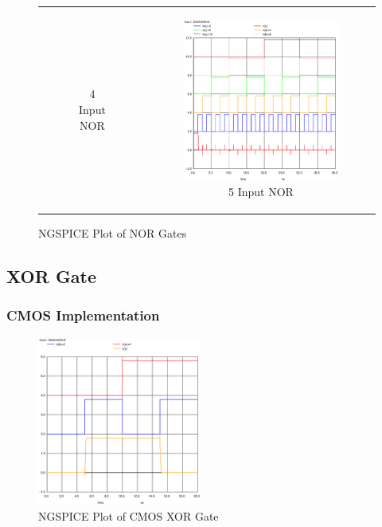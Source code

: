\documentclass[conference]{IEEEtran}
\begin{document}
\begin{figure}[H]
\begin{tabular}{cc}
\begin{subfigure}{0.44\linewidth}
            \caption{4 Input NOR}
        \end{subfigure} &
        \begin{subfigure}{0.44\linewidth}
            \centering
            \includegraphics[width=\textwidth]{images/nor_5_cmos_tran.eps}
            \caption{5 Input NOR}
        \end{subfigure}
    \end{tabular}
    \caption{NGSPICE Plot of NOR Gates}
\end{figure}

\subsection{XOR Gate}

\subsubsection{CMOS Implementation}

\begin{figure}[H]
    \centering
    \includegraphics[width=0.48\textwidth]{images/xor_cmos_tran.eps}
    \caption{NGSPICE Plot of CMOS XOR Gate}
\end{figure}
\end{document}
